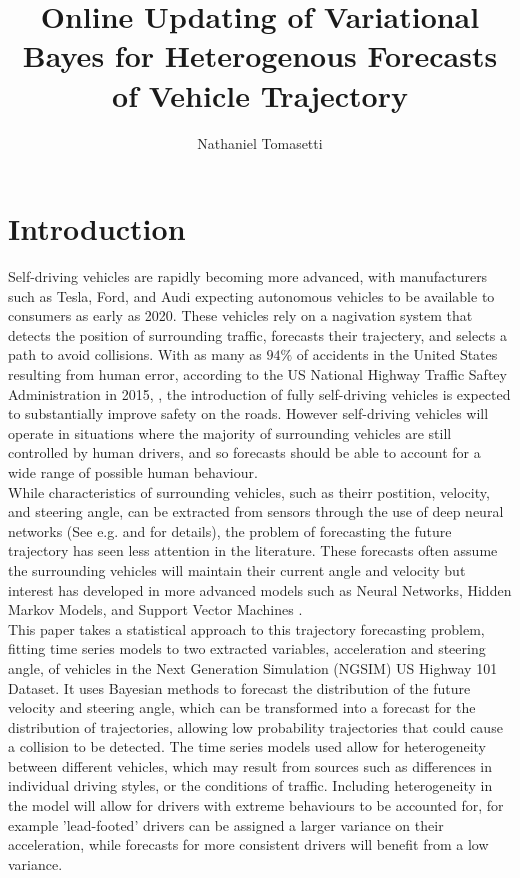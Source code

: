 \documentclass[12pt,a4paper]{article}\usepackage[]{graphicx}\usepackage[]{color}
\title{Online Updating of Variational Bayes for Heterogenous Forecasts of Vehicle Trajectory}
\author{Nathaniel Tomasetti}
\date{}
\begin{document}
\maketitle



\section{Introduction}
\label{sec:intro}

Self-driving vehicles are rapidly becoming more advanced, with manufacturers such as Tesla, Ford, and Audi expecting autonomous vehicles to be available to consumers as early as 2020. These vehicles rely on a nagivation system that detects the position of surrounding traffic, forecasts their trajectery, and selects a path to avoid collisions. With as many as $94\%$ of accidents in the United States resulting from human error, according to the US National Highway Traffic Saftey Administration in 2015, \citep{NHTSA2015}, the introduction of fully self-driving vehicles is expected to substantially improve safety on the roads. However self-driving vehicles will operate in situations where the majority of surrounding vehicles are still controlled by human drivers, and so forecasts should be able to account for a wide range of possible human behaviour.
\\

While characteristics of surrounding vehicles, such as theirr postition, velocity, and steering angle, can be extracted from sensors through the use of deep neural networks (See e.g. \citet{Woo2016a} and \citet{Tian2017} for details), the problem of forecasting the future trajectory has seen less attention in the literature. These forecasts often assume the surrounding vehicles will maintain their current angle and velocity \citep{Gindele2010, Houenou2013, Bautista2017, Waymo2017} but interest has developed in more advanced models such as Neural Networks, Hidden Markov Models, and Support Vector Machines \citep{Ding2013, Woo2016b, Geng2017, Woo2017}.
\\

This paper takes a statistical approach to this trajectory forecasting problem, fitting time series models to two extracted variables, acceleration and steering angle, of vehicles in the Next Generation Simulation (NGSIM) US Highway 101 Dataset. It uses Bayesian methods to forecast the distribution of the future velocity and steering angle, which can be transformed into a forecast for the distribution of trajectories, allowing low probability trajectories that could cause a collision to be detected. The time series models used allow for heterogeneity between different vehicles, which may result from sources such as differences in individual driving styles, or the conditions of traffic. Including heterogeneity in the model will allow for drivers with extreme behaviours to be accounted for, for example 'lead-footed' drivers can be assigned a larger variance on their acceleration, while forecasts for more consistent drivers will benefit from a low variance.
\\
\end{document}
